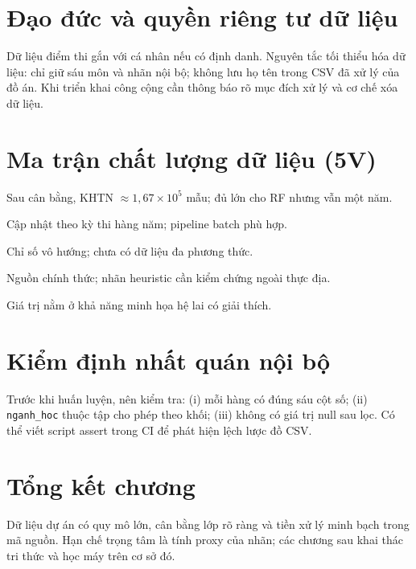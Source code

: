 \section{Đạo đức và quyền riêng tư dữ liệu}
Dữ liệu điểm thi gắn với cá nhân nếu có định danh. Nguyên tắc tối thiểu hóa dữ liệu: chỉ giữ sáu môn và nhãn nội bộ; không lưu họ tên trong CSV đã xử lý của đồ án. Khi triển khai công cộng cần thông báo rõ mục đích xử lý và cơ chế xóa dữ liệu.

\section{Ma trận chất lượng dữ liệu (5V)}
\begin{description}[style=nextline,leftmargin=0cm]
  \item[Volume] Sau cân bằng, KHTN $\approx 1{,}67\times 10^5$ mẫu; đủ lớn cho RF nhưng vẫn một năm.
  \item[Velocity] Cập nhật theo kỳ thi hàng năm; pipeline batch phù hợp.
  \item[Variety] Chỉ số vô hướng; chưa có dữ liệu đa phương thức.
  \item[Veracity] Nguồn chính thức; nhãn heuristic cần kiểm chứng ngoài thực địa.
  \item[Value] Giá trị nằm ở khả năng minh họa hệ lai có giải thích.
\end{description}

\section{Kiểm định nhất quán nội bộ}
Trước khi huấn luyện, nên kiểm tra: (i) mỗi hàng có đúng sáu cột số; (ii) \texttt{nganh\_hoc} thuộc tập cho phép theo khối; (iii) không có giá trị null sau lọc. Có thể viết script assert trong CI để phát hiện lệch lược đồ CSV.

\section{Tổng kết chương}
Dữ liệu dự án có quy mô lớn, cân bằng lớp rõ ràng và tiền xử lý minh bạch trong mã nguồn. Hạn chế trọng tâm là tính proxy của nhãn; các chương sau khai thác tri thức và học máy trên cơ sở đó.
